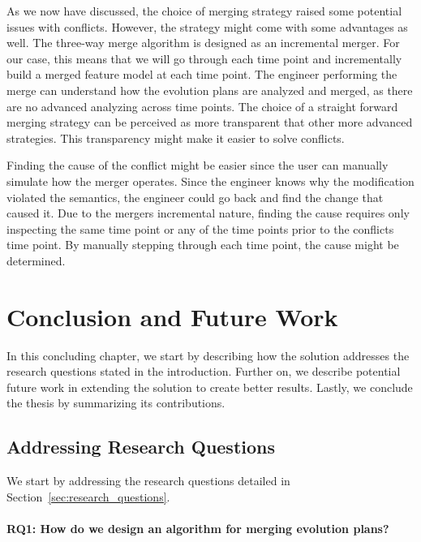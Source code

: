 \documentclass[a4paper,english]{ifimaster}
\begin{document}
As we now have discussed, the choice of merging strategy raised some potential issues with conflicts. However, the strategy might come with some advantages as well. The three-way merge algorithm is designed as an incremental merger. For our case, this means that we will go through each time point and incrementally build a merged feature model at each time point. The engineer performing the merge can understand how the evolution plans are analyzed and merged, as there are no advanced analyzing across time points. The choice of a straight forward merging strategy can be perceived as more transparent that other more advanced strategies. This transparency might make it easier to solve conflicts.

Finding the cause of the conflict might be easier since the user can manually simulate how the merger operates. Since the engineer knows why the modification violated the semantics, the engineer could go back and find the change that caused it. Due to the mergers incremental nature, finding the cause requires only inspecting the same time point or any of the time points prior to the conflicts time point. By manually stepping through each time point, the cause might be determined.

\chapter{Conclusion and Future Work}%
\label{cha:conclusion_and_future_work}

In this concluding chapter, we start by describing how the solution addresses the research questions stated in the introduction. Further on, we describe potential future work in extending the solution to create better results. Lastly, we conclude the thesis by summarizing its contributions.

\section{Addressing Research Questions}%
\label{sec:addressing_research_questions}

We start by addressing the research questions detailed in Section~\vref{sec:research_questions}.

\subsubsection{RQ1: How do we design an algorithm for merging evolution plans?} 
\end{document}

